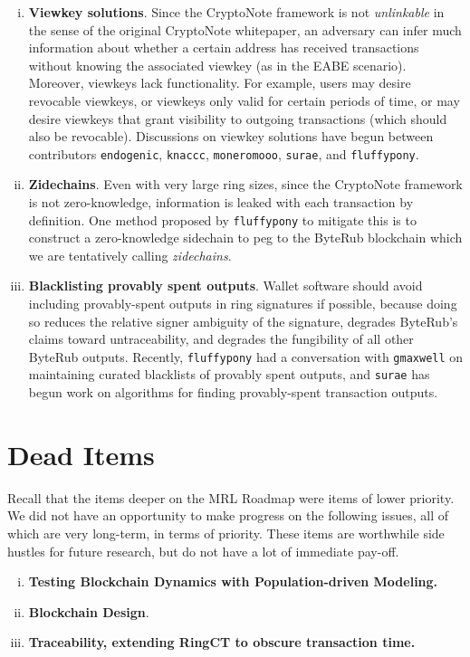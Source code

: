 \documentclass[12pt,english]{mrl}
\theoremstyle{definition}
\numberwithin{equation}{section}
\numberwithin{figure}{section}
\numberwithin{equation}{section}
\numberwithin{equation}{section}
\numberwithin{figure}{section}
\begin{document}
\begin{enumerate}[i.]
\item \textbf{Viewkey solutions}. Since the CryptoNote framework is not \emph{unlinkable} in the sense of the original CryptoNote whitepaper, an adversary can infer much information about whether a certain address has received transactions without knowing the associated viewkey (as in the EABE scenario). Moreover, viewkeys lack functionality. For example, users may desire revocable viewkeys, or viewkeys only valid for certain periods of time, or may desire viewkeys that grant visibility to outgoing transactions (which should also be revocable). Discussions on viewkey solutions have begun between contributors \texttt{endogenic}, \texttt{knaccc}, \texttt{moneromooo}, \texttt{surae}, and  \texttt{fluffypony}.

\item \textbf{Zidechains}. Even with very large ring sizes, since the CryptoNote framework is not zero-knowledge, information is leaked with each transaction by definition. One method proposed by \texttt{fluffypony} to mitigate this is to construct a zero-knowledge sidechain to peg to the ByteRub blockchain which we are tentatively calling \textit{zidechains}.

\item \textbf{Blacklisting provably spent outputs}. Wallet software should avoid including provably-spent outputs in ring signatures if possible, because doing so reduces the relative signer ambiguity of the signature, degrades ByteRub's claims toward untraceability, and degrades the fungibility of all other ByteRub outputs. Recently, \texttt{fluffypony} had a conversation with \texttt{gmaxwell} on maintaining curated blacklists of provably spent outputs, and \texttt{surae} has begun work on algorithms for finding provably-spent transaction outputs.
\end{enumerate}


\section{Dead Items}

Recall that the items deeper on the MRL Roadmap were items of lower priority. We did not have an opportunity to make progress on the following issues, all of which are very long-term, in terms of priority. These items are worthwhile side hustles for future research, but do not have a lot of immediate pay-off.

\begin{enumerate}[i.]
    \item \textbf{Testing Blockchain Dynamics with Population-driven Modeling.} 
    
    \item \textbf{Blockchain Design}.
    
    \item \textbf{Traceability, extending RingCT to obscure transaction time.}
\end{enumerate}
\end{document}
